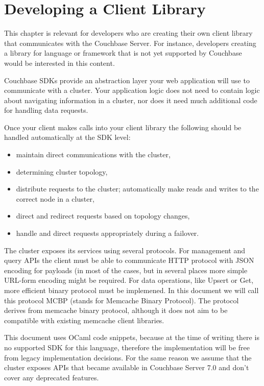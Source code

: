 \documentclass{report}
\begin{document}
\chapter{Developing a Client Library}

This chapter is relevant for developers who are creating their own client library that communicates with the Couchbase
Server. For instance, developers creating a library for language or framework that is not yet supported by Couchbase
would be interested in this content.

Couchbase SDKs provide an abstraction layer your web application will use to communicate with a cluster. Your
application logic does not need to contain logic about navigating information in a cluster, nor does it need much
additional code for handling data requests.

Once your client makes calls into your client library the following should be handled automatically at the SDK level:

\begin{itemize}
    \item maintain direct communications with the cluster,

    \item determining cluster topology,

    \item distribute requests to the cluster; automatically make reads and writes to the correct node in a cluster,

    \item direct and redirect requests based on topology changes,

    \item handle and direct requests appropriately during a failover.
\end{itemize}

The cluster exposes its services using several protocols. For management and query APIs the client must be able to
communicate HTTP protocol with JSON encoding for payloads (in most of the cases, but in several places more simple
URL-form encoding might be required. For data operations, like Upsert or Get, more efficient binary protocol must be
implemened. In this document we will call this protocol MCBP (stands for Memcache Binary Protocol). The protocol derives
from memcache binary protocol, although it does not aim to be compatible with existing memcache client libraries.

This document uses OCaml code snippets, because at the time of writing there is no supported SDK for this language,
therefore the implementation will be free from legacy implementation decisions. For the same reason we assume that the
cluster exposes APIs that became available in Couchbase Server 7.0 and don't cover any deprecated features.
\end{document}
